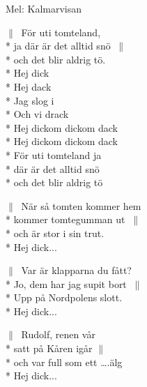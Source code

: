 \begin{SongText}[Tomtevisan]
    \begin{SongVerse}
        Mel: Kalmarvisan
    \end{SongVerse}
    \begin{SongVerse}
        $\|\:$ För uti tomteland,\\*%
        ja där är det alltid snö $\:\|$\\*%
        och det blir aldrig tö.\\*%
        Hej dick\\*%
        Hej dack\\*%
        Jag slog i\\*%
        Och vi drack\\*%
        Hej dickom dickom dack\\*%
        Hej dickom dickom dack\\*%
        För uti tomteland ja\\*%
        där är det alltid snö\\*%
        och det blir aldrig tö
    \end{SongVerse}
    \begin{SongVerse}
        $\|\:$ När så tomten kommer hem\\*%
        kommer tomtegumman ut $\:\|$\\*%
        och är stor i sin trut.\\*%
        Hej dick...
    \end{SongVerse}
    \begin{SongVerse}
        $\|\:$ Var är klapparna du fått?\\*%
        Jo, dem har jag supit bort $\:\|$\\*%
        Upp på Nordpolens slott.\\*%
        Hej dick...
    \end{SongVerse}
    \begin{SongVerse}
        $\|\:$ Rudolf, renen vår\\*%
        satt på Kåren igår $\|\:$\\*%
        och var full som ett ….älg\\*%
        Hej dick...
    \end{SongVerse}
    \begin{SongVerse}
    \end{SongVerse}
\end{SongText}
